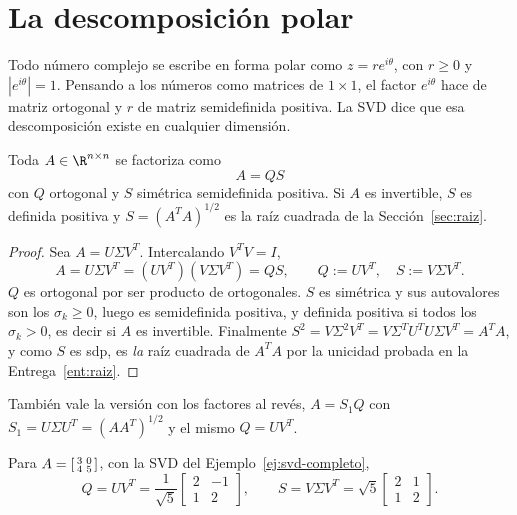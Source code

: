 \section{La descomposición polar}
\label{sec:polar}

Todo número complejo se escribe en forma polar como $z=re^{i\theta}$, con
$r\ge0$ y $|e^{i\theta}|=1$. Pensando a los números como matrices de
$1\times1$, el factor $e^{i\theta}$ hace de matriz ortogonal y $r$ de matriz
semidefinida positiva. La SVD dice que esa descomposición existe en cualquier
dimensión.

\begin{theorem}\label{teo:polar}
Toda $A\in\R^{n\times n}$ se factoriza como
\[
\boxed{\ A=QS\ }
\]
con $Q$ ortogonal y $S$ simétrica semidefinida positiva. Si $A$ es
invertible, $S$ es definida positiva y $S=(A^TA)^{1/2}$ es la raíz cuadrada
de la Sección~\ref{sec:raiz}.
\end{theorem}

\begin{proof}
Sea $A=U\Sigma V^T$. Intercalando $V^TV=I$,
\[
A=U\Sigma V^T=(UV^T)(V\Sigma V^T)=QS,
\qquad Q:=UV^T,\quad S:=V\Sigma V^T .
\]
$Q$ es ortogonal por ser producto de ortogonales. $S$ es simétrica y sus
autovalores son los $\sigma_k\ge0$, luego es semidefinida positiva, y
definida positiva si todos los $\sigma_k>0$, es decir si $A$ es invertible.
Finalmente $S^2=V\Sigma^2V^T=V\Sigma^TU^TU\Sigma V^T=A^TA$, y como $S$ es
sdp, es \emph{la} raíz cuadrada de $A^TA$ por la unicidad probada en la
Entrega~\ref{ent:raiz}.
\end{proof}

También vale la versión con los factores al revés, $A=S_1Q$ con
$S_1=U\Sigma U^T=(AA^T)^{1/2}$ y el mismo $Q=UV^T$.

\begin{example}
Para $A=\begin{bsmallmatrix}3&0\\ 4&5\end{bsmallmatrix}$, con la SVD del
Ejemplo~\ref{ej:svd-completo},
\[
Q=UV^T=\frac1{\sqrt5}\begin{bmatrix}2&-1\\ 1&2\end{bmatrix},
\qquad
S=V\Sigma V^T=\sqrt5\begin{bmatrix}2&1\\ 1&2\end{bmatrix} .
\]
\end{example}

